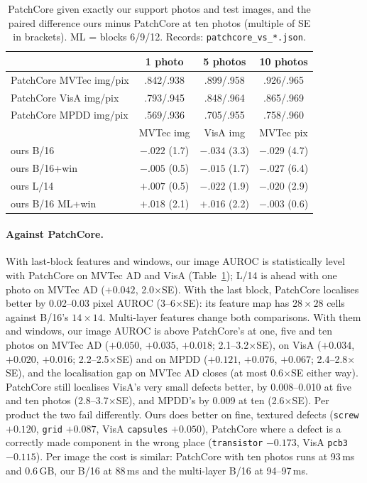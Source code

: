 \documentclass[10pt,twocolumn]{article}
\begin{document}
\begin{table}[t]
\centering\small
\caption{PatchCore given exactly our support photos and test images, and the
paired difference ours minus PatchCore at ten photos (multiple of SE in
brackets). ML = blocks 6/9/12. Records: \texttt{patchcore\_vs\_*.json}.}
\label{tab:patchcore}
\footnotesize
\setlength{\tabcolsep}{2.4pt}
\begin{tabular}{lccc}
\toprule
 & 1 photo & 5 photos & 10 photos \\
\midrule
PatchCore MVTec img/pix & .842/.938 & .899/.958 & .926/.965 \\
PatchCore VisA img/pix & .793/.945 & .848/.964 & .865/.969 \\
PatchCore MPDD img/pix & .569/.936 & .705/.955 & .758/.960 \\
\midrule
 & MVTec img & VisA img & MVTec pix \\
\midrule
ours B/16 & $-.022$ (1.7) & $-.034$ (3.3) & $-.029$ (4.7) \\
ours B/16+win & $-.005$ (0.5) & $-.015$ (1.7) & $-.027$ (6.4) \\
ours L/14 & $+.007$ (0.5) & $-.022$ (1.9) & $-.020$ (2.9) \\
ours B/16 ML+win & $+.018$ (2.1) & $+.016$ (2.2) & $-.003$ (0.6) \\
\bottomrule
\end{tabular}
\end{table}

\paragraph{Against PatchCore.} With last-block features and windows, our image
AUROC is statistically level with PatchCore on MVTec AD and VisA
(Table~\ref{tab:patchcore}); L/14 is ahead with one photo on MVTec AD ($+0.042$,
2.0$\times$SE). With the last block, PatchCore localises better by 0.02--0.03
pixel AUROC (3--6$\times$SE): its feature map has $28\times28$ cells against
B/16's $14\times14$. Multi-layer features change both comparisons. With them and
windows, our image AUROC is above PatchCore's at one, five and ten photos on MVTec
AD ($+0.050$, $+0.035$, $+0.018$; 2.1--3.2$\times$SE), on VisA ($+0.034$,
$+0.020$, $+0.016$; 2.2--2.5$\times$SE) and on MPDD ($+0.121$, $+0.076$, $+0.067$;
2.4--2.8$\times$SE), and the localisation gap on MVTec AD closes (at most
0.6$\times$SE either way). PatchCore still localises VisA's very small defects
better, by 0.008--0.010 at five and ten photos (2.8--3.7$\times$SE), and MPDD's
by 0.009 at ten (2.6$\times$SE). Per product the two
fail differently. Ours does better on fine, textured defects (\texttt{screw}
$+0.120$, \texttt{grid} $+0.087$, VisA \texttt{capsules} $+0.050$), PatchCore where
a defect is a correctly made component in the wrong place (\texttt{transistor}
$-0.173$, VisA \texttt{pcb3} $-0.115$). Per image the cost is similar: PatchCore
with ten photos runs at 93\,ms and 0.6\,GB, our B/16 at 88\,ms and the
multi-layer B/16 at 94--97\,ms.
\end{document}

